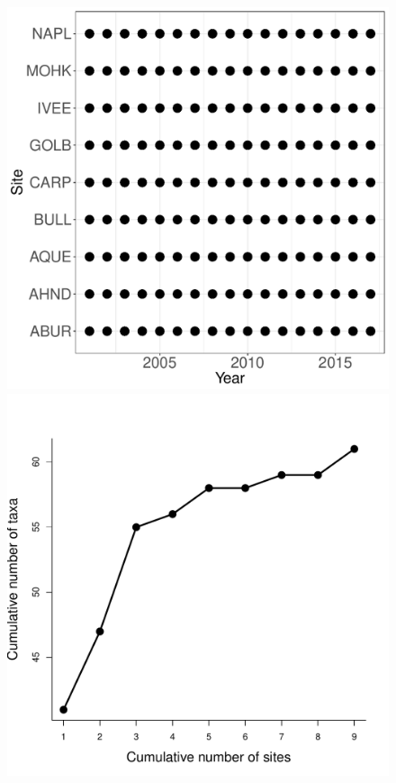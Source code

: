\documentclass[11pt, oneside]{article}
\begin{document}
\begin{figure}[h!]
\includegraphics[scale = 0.4]{sbc-algae-castorani_spatiotemporal_sampling_effort.pdf}
\includegraphics[scale = 0.4]{sbc-algae-castorani_species_accumulation_space.pdf}

\end{figure}
\end{document}
